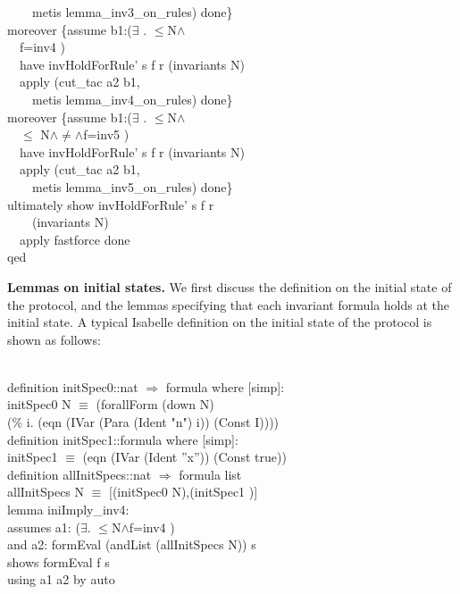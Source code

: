 \begin{specification}
~~~~metis lemma\_inv3\_on\_rules) done\}\\
moreover \{assume b1:($\exists$ . $\le$N$\wedge$ \\
~~f=inv4  )\\
~~have invHoldForRule' s f r (invariants N)\\
~~apply (cut\_tac a2 b1,\\
~~~~metis lemma\_inv4\_on\_rules) done\}\\
moreover \{assume b1:($\exists$  . $\le$N$\wedge$\\
~~$\le$ N$\wedge$$\neq$$\wedge$f=inv5   )\\
~~have invHoldForRule' s f r (invariants N)\\
~~apply (cut\_tac a2 b1,\\
~~~~metis lemma\_inv5\_on\_rules) done\}\\
ultimately show invHoldForRule' s f r\\
~~~~(invariants N)\\
~~apply fastforce done\\
qed\\
\end{specification}

\medskip\noindent
{\bf Lemmas on initial states.}
We first discuss the definition on the initial state of the protocol,
and the lemmas specifying that each invariant formula holds at the initial state.
A typical Isabelle definition on the initial state of the protocol is shown as follows:\\

\begin{specification}
\\
definition initSpec0::nat $\Rightarrow$ formula where [simp]:\\
initSpec0 N $\equiv$ (forallForm (down N) \\
(\% i. (eqn (IVar (Para (Ident "n") i)) (Const I))))\\

definition initSpec1::formula where [simp]:\\
initSpec1  $\equiv$ (eqn (IVar (Ident ''x'')) (Const true))\\

definition allInitSpecs::nat $\Rightarrow$ formula list\\
allInitSpecs N $\equiv$ [(initSpec0 N),(initSpec1 )]\\

lemma iniImply\_inv4:\\
assumes a1: ($\exists$. $\le$N$\wedge$f=inv4 )\\
and a2: formEval (andList (allInitSpecs N)) s\\
shows formEval f s\\
 using a1 a2 by auto\\
\end{specification}

